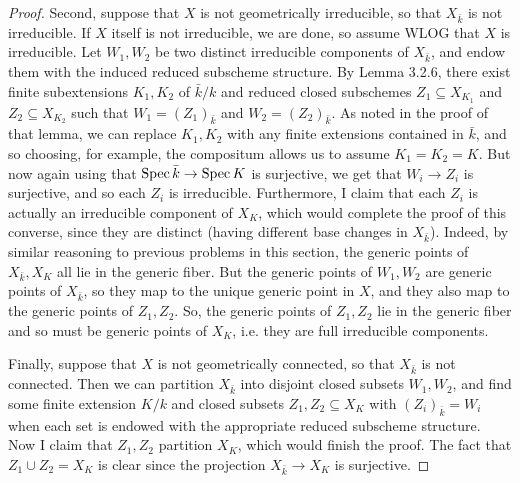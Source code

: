 \begin{proof}
	Second, suppose that $X$ is not geometrically irreducible, so that $X_{\bar{k}}$ is not irreducible. If $X$ itself is not irreducible, we are done, so assume WLOG that $X$ is irreducible. Let $W_1,W_2$ be two distinct irreducible components of $X_{\bar{k}}$, and endow them with the induced reduced subscheme structure. By Lemma 3.2.6, there exist finite subextensions $K_1,K_2$ of $\bar{k}/k$ and reduced closed subschemes $Z_1 \subseteq X_{K_1}$ and $Z_2 \subseteq X_{K_2}$ such that $W_1 = (Z_1)_{\bar{k}}$ and $W_2 = (Z_2)_{\bar{k}}$. As noted in the proof of that lemma, we can replace $K_1,K_2$ with any finite extensions contained in $\bar{k}$, and so choosing, for example, the compositum allows us to assume $K_1 = K_2 = K$. But now again using that $\operatorname{Spec}\bar{k} \to \operatorname{Spec} K$ is surjective, we get that $W_i \to Z_i$ is surjective, and so each $Z_i$ is irreducible. Furthermore, I claim that each $Z_i$ is actually an irreducible component of $X_K$, which would complete the proof of this converse, since they are distinct (having different base changes in $X_{\bar{k}}$). Indeed, by similar reasoning to previous problems in this section, the generic points of $X_{\bar{k}},X_K$ all lie in the generic fiber. But the generic points of $W_1,W_2$ are generic points of $X_{\bar{k}}$, so they map to the unique generic point in $X$, and they also map to the generic points of $Z_1,Z_2$. So, the generic points of $Z_1,Z_2$ lie in the generic fiber and so must be generic points of $X_K$, i.e. they are full irreducible components.
	
	Finally, suppose that $X$ is not geometrically connected, so that $X_{\bar{k}}$ is not connected. Then we can partition $X_{\bar{k}}$ into disjoint closed subsets $W_1,W_2$, and find some finite extension $K/k$ and closed subsets $Z_1,Z_2 \subseteq X_K$ with $(Z_i)_{\bar{k}} = W_i$ when each set is endowed with the appropriate reduced subscheme structure. Now I claim that $Z_1,Z_2$ partition $X_K$, which would finish the proof. The fact that $Z_1 \cup Z_2 = X_K$ is clear since the projection $X_{\bar{k}} \to X_K$ is surjective. 
\end{proof}

